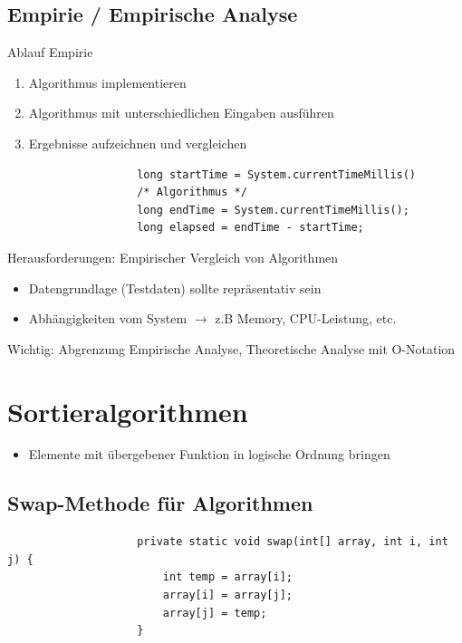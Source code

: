 \documentclass[a4paper, landscape, 8pt]{scrartcl}
\begin{document}
\begin{multicols*}{4}
            \subsection{Empirie / Empirische Analyse}
                \textcolor{subsectioncolor}{Ablauf Empirie}
                \begin{enumerate}
                    \item Algorithmus implementieren
                    \item Algorithmus mit unterschiedlichen Eingaben ausführen
                    \item Ergebnisse aufzeichnen und vergleichen
                \end{enumerate}
                \begin{lstlisting}
                    long startTime = System.currentTimeMillis()
                    /* Algorithmus */
                    long endTime = System.currentTimeMillis();
                    long elapsed = endTime - startTime;
                \end{lstlisting}
                \textcolor{subsectioncolor}{Herausforderungen: Empirischer Vergleich von Algorithmen}
                \begin{itemize}
                    \item Datengrundlage (Testdaten) sollte repräsentativ sein
                    \item Abhängigkeiten vom System $\to$ z.B Memory, CPU-Leistung, etc.
                \end{itemize}

                Wichtig: Abgrenzung Empirische Analyse, Theoretische Analyse mit O-Notation
        \section{Sortieralgorithmen}
            \begin{itemize}
                \item Elemente mit übergebener Funktion in logische Ordnung bringen
            \end{itemize}
            \subsection{Swap-Methode für Algorithmen}
            \begin{lstlisting}
                    private static void swap(int[] array, int i, int j) {
                        int temp = array[i];
                        array[i] = array[j];
                        array[j] = temp;
                    }
            \end{lstlisting}

\end{multicols*}
\end{document}
